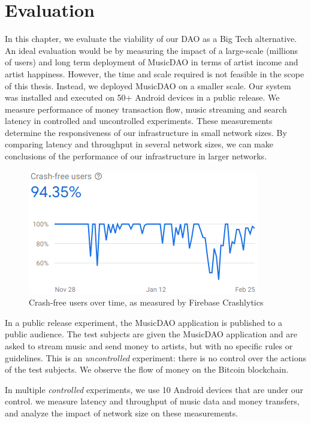 \chapter{\label{chap:evaluation}Evaluation}
In this chapter, we evaluate the viability of our DAO as a Big Tech alternative. An ideal evaluation would be by measuring the impact of a large-scale (millions of users) and long term deployment of MusicDAO in terms of artist income and artist happiness. However, the time and scale required is not feasible in the scope of this thesis. Instead, we deployed MusicDAO on a smaller scale. Our system was installed and executed on 50+ Android devices in a public release. We measure performance of money transaction flow, music streaming and search latency in controlled and uncontrolled experiments. These measurements determine the responsiveness of our infrastructure in small network sizes. By comparing latency and throughput in several network sizes, we can make conclusions of the performance of our infrastructure in larger networks.

\begin{figure}
    \centering
    \includegraphics[width=0.4\linewidth]{evaluation/crash-free-users-90-days.png}
    \caption{Crash-free users over time, as measured by Firebase Crashlytics}
    \label{fig:crash-free-users}
\end{figure}
In a public release experiment, the MusicDAO application is published to a public audience. The test subjects are given the MusicDAO application and are asked to stream music and send money to artists, but with no specific rules or guidelines. This is an \textit{uncontrolled} experiment: there is no control over the actions of the test subjects. We observe the flow of money on the Bitcoin blockchain. 

In multiple \textit{controlled} experiments, we use 10 Android devices that are under our control. we measure latency and throughput of music data and money transfers, and analyze the impact of network size on these measurements.



